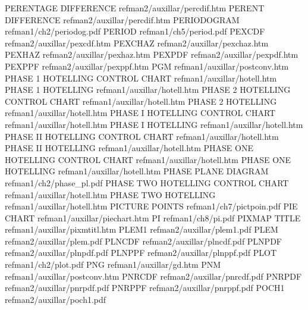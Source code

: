 PERENTAGE DIFFERENCE                    refman2/auxillar/percdif.htm
PERENT DIFFERENCE                       refman2/auxillar/percdif.htm
PERIODOGRAM                             refman1/ch2/periodog.pdf
PERIOD                                  refman1/ch5/period.pdf
PEXCDF                                  refman2/auxillar/pexcdf.htm
PEXCHAZ                                 refman2/auxillar/pexchaz.htm
PEXHAZ                                  refman2/auxillar/pexhaz.htm
PEXPDF                                  refman2/auxillar/pexpdf.htm
PEXPPF                                  refman2/auxillar/pexppf.htm
PGM                                     refman1/auxillar/postconv.htm
PHASE 1 HOTELLING CONTROL CHART         refman1/auxillar/hotell.htm
PHASE 1 HOTELLING                       refman1/auxillar/hotell.htm
PHASE 2 HOTELLING CONTROL CHART         refman1/auxillar/hotell.htm
PHASE 2 HOTELLING                       refman1/auxillar/hotell.htm
PHASE I HOTELLING CONTROL CHART         refman1/auxillar/hotell.htm
PHASE I HOTELLING                       refman1/auxillar/hotell.htm
PHASE II HOTELLING CONTROL CHART        refman1/auxillar/hotell.htm
PHASE II HOTELLING                      refman1/auxillar/hotell.htm
PHASE ONE HOTELLING CONTROL CHART       refman1/auxillar/hotell.htm
PHASE ONE HOTELLING                     refman1/auxillar/hotell.htm
PHASE PLANE DIAGRAM                     refman1/ch2/phase_pl.pdf
PHASE TWO HOTELLING CONTROL CHART       refman1/auxillar/hotell.htm
PHASE TWO HOTELLING                     refman1/auxillar/hotell.htm
PICTURE POINTS                          refman1/ch7/pictpoin.pdf
PIE CHART                               refman1/auxillar/piechart.htm
PI                                      refman1/ch8/pi.pdf
PIXMAP TITLE                            refman1/auxillar/pixmtitl.htm
PLEM1                                   refman2/auxillar/plem1.pdf
PLEM                                    refman2/auxillar/plem.pdf
PLNCDF                                  refman2/auxillar/plncdf.pdf
PLNPDF                                  refman2/auxillar/plnpdf.pdf
PLNPPF                                  refman2/auxillar/plnppf.pdf
PLOT                                    refman1/ch2/plot.pdf
PNG                                     refman1/auxillar/gd.htm
PNM                                     refman1/auxillar/postconv.htm
PNRCDF                                  refman2/auxillar/pnrcdf.pdf
PNRPDF                                  refman2/auxillar/pnrpdf.pdf
PNRPPF                                  refman2/auxillar/pnrppf.pdf
POCH1                                   refman2/auxillar/poch1.pdf
